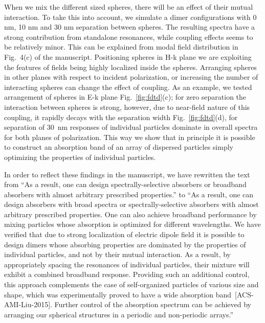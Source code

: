 \documentclass[a4paper]{article}
\begin{document}
When we mix the different sized spheres, there will be an effect of
their mutual interaction. To take this into account, we simulate a
dimer configurations with 0 nm, 10 nm and 30 nm separation between
spheres.  The resulting spectra have a strong contribution from
standalone resonances, while coupling effects seems to be relatively
minor. This can be explained from modal field distribution in
Fig.~4(c) of the manuscript. Positioning spheres in H-k plane we are
exploiting the features of fields being highly localized inside the
spheres. Arranging spheres in other planes with respect to incident
polarization, or increasing the number of interacting spheres can
change the effect of coupling. As an example, we tested arrangement of
spheres in E-k plane Fig.~\ref{fig:fdtd}(c); for zero separation the
interaction between spheres is strong, however, due to near-field
nature of this coupling, it rapidly decays with the separation width
Fig.~\ref{fig:fdtd}(d), for separation of 30~nm responses of
individual particles dominate in overall spectra for both planes of
polarization. This way we show that in principle it is possible to
construct an absorption band of an array of dispersed particles simply
optimizing the properties of individual particles.

In order to reflect these findings in the manuscript, we have
rewritten the text from ``As a result, one can design
spectrally-selective absorbers or broadband absorbers with almost
arbitrary prescribed properties.'' to ``As a result, one can design
absorbers with broad spectra or spectrally-selective absorbers with
almost arbitrary prescribed properties.  One can also achieve
broadband performance by mixing particles whose absorption is
optimized for different wavelengths. We have verified that due to
strong localization of electric dipole field it is possible to design
dimers whose absorbing properties are dominated by the properties of
individual particles, and not by their mutual interaction. As a
result, by appropriately spacing the resonances of individual
particles, their mixture will exhibit a combined broadband
response. Providing such an additional control, this approach
complements the case of self-organized particles of various size and
shape, which was experimentally proved to have a wide absorption
band~[ACS-AMI-Liu-2015]. %
Further control of the absorption spectrum can be achieved by
arranging our spherical structures in a periodic and non-periodic
arrays.''
\end{document}
